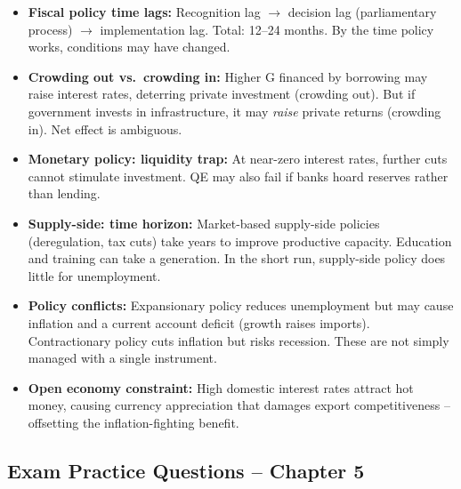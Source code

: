 \documentclass[11pt, a4paper, twoside]{book}
\begin{document}
\begin{tcolorbox}[enhanced,colback=EvalBg,colframe=EvalFrame,arc=0pt,boxrule=1pt,title={\bfseries\color{EvalFrame}Evaluation: Fiscal, Monetary and Supply-Side Policy},fonttitle=\small]
\small\RaggedRight
\begin{itemize}[itemsep=2pt,topsep=2pt]
  \item \textbf{Fiscal policy time lags:} Recognition lag $\to$ decision lag (parliamentary process) $\to$ implementation lag. Total: 12--24 months. By the time policy works, conditions may have changed.
  \item \textbf{Crowding out vs.\ crowding in:} Higher G financed by borrowing may raise interest rates, deterring private investment (crowding out). But if government invests in infrastructure, it may \textit{raise} private returns (crowding in). Net effect is ambiguous.
  \item \textbf{Monetary policy: liquidity trap:} At near-zero interest rates, further cuts cannot stimulate investment. QE may also fail if banks hoard reserves rather than lending.
  \item \textbf{Supply-side: time horizon:} Market-based supply-side policies (deregulation, tax cuts) take years to improve productive capacity. Education and training can take a generation. In the short run, supply-side policy does little for unemployment.
  \item \textbf{Policy conflicts:} Expansionary policy reduces unemployment but may cause inflation and a current account deficit (growth raises imports). Contractionary policy cuts inflation but risks recession. These are not simply managed with a single instrument.
  \item \textbf{Open economy constraint:} High domestic interest rates attract hot money, causing currency appreciation that damages export competitiveness -- offsetting the inflation-fighting benefit.
\end{itemize}
\end{tcolorbox}

\subsection{Exam Practice Questions -- Chapter 5}
\end{document}
